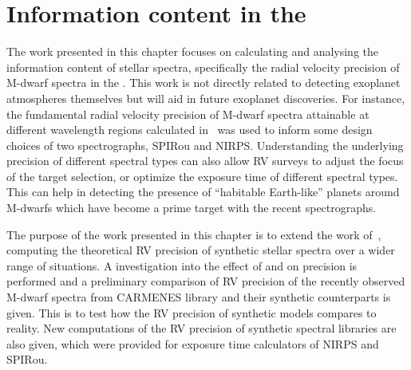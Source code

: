 
\chapter{Information content in the \nir{}}
\label{cha:nir_content}

The work presented in this chapter focuses on calculating and analysing the information content of stellar spectra, specifically the radial velocity precision of M-dwarf spectra in the \nir{}.
This work is not directly related to detecting exoplanet atmospheres themselves but will aid in future exoplanet discoveries.
For instance, the fundamental radial velocity precision of {M-dwarf} spectra attainable at different wavelength regions calculated in~\citet{figueira_radial_2016} was used to inform some design choices of two \nir{} spectrographs, {SPIRou} and {NIRPS}.
Understanding the underlying precision of different spectral types can also allow {RV} surveys to adjust the focus of the target selection, or optimize the exposure time of different spectral types.
This can help in detecting the presence of ``habitable Earth-like'' planets around {M-dwarfs} which have become a prime target with the recent \nir{} spectrographs.

The purpose of the work presented in this chapter is to extend the work of~\citet{figueira_radial_2016}, computing the theoretical {RV} precision of synthetic stellar spectra over a wider range of situations.
A investigation into the effect of \Logg{} and \feh{} on precision is performed and a preliminary comparison of {RV} precision of the recently observed \nir{} {M-dwarf} spectra from {CARMENES} library and their synthetic counterparts is given.
This is to test how the {RV} precision of synthetic models compares to reality.
New computations of the {RV} precision of synthetic spectral libraries are also given, which were provided for exposure time calculators of {NIRPS} and {SPIRou}.


